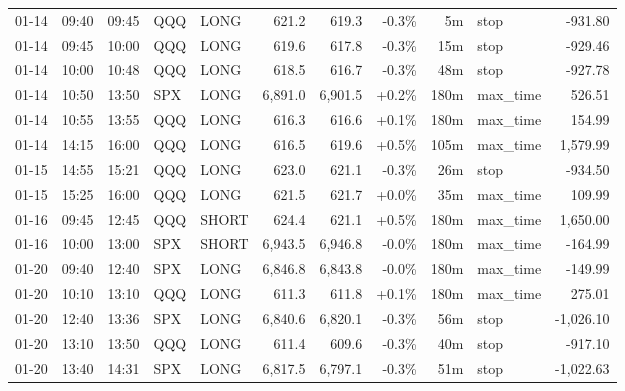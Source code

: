 \documentclass[11pt,a4paper,twoside]{article}
\begin{document}
\begin{center}
\begin{longtable}{>{\color{txtmain}}l l l l l r r r r >{\color{txtmain}}l r}
01-14 & 09:40 & 09:45 & QQQ & LONG & 621.2 & 619.3 & \textcolor{lossred}{-0.3\%} & 5m & stop & \textcolor{lossred}{-931.80} \\
01-14 & 09:45 & 10:00 & QQQ & LONG & 619.6 & 617.8 & \textcolor{lossred}{-0.3\%} & 15m & stop & \textcolor{lossred}{-929.46} \\
01-14 & 10:00 & 10:48 & QQQ & LONG & 618.5 & 616.7 & \textcolor{lossred}{-0.3\%} & 48m & stop & \textcolor{lossred}{-927.78} \\
01-14 & 10:50 & 13:50 & SPX & LONG & 6,891.0 & 6,901.5 & \textcolor{wingreen}{+0.2\%} & 180m & max\_time & \textcolor{wingreen}{526.51} \\
01-14 & 10:55 & 13:55 & QQQ & LONG & 616.3 & 616.6 & \textcolor{wingreen}{+0.1\%} & 180m & max\_time & \textcolor{wingreen}{154.99} \\
01-14 & 14:15 & 16:00 & QQQ & LONG & 616.5 & 619.6 & \textcolor{wingreen}{+0.5\%} & 105m & max\_time & \textcolor{wingreen}{1,579.99} \\
01-15 & 14:55 & 15:21 & QQQ & LONG & 623.0 & 621.1 & \textcolor{lossred}{-0.3\%} & 26m & stop & \textcolor{lossred}{-934.50} \\
01-15 & 15:25 & 16:00 & QQQ & LONG & 621.5 & 621.7 & \textcolor{wingreen}{+0.0\%} & 35m & max\_time & \textcolor{wingreen}{109.99} \\
01-16 & 09:45 & 12:45 & QQQ & SHORT & 624.4 & 621.1 & \textcolor{wingreen}{+0.5\%} & 180m & max\_time & \textcolor{wingreen}{1,650.00} \\
01-16 & 10:00 & 13:00 & SPX & SHORT & 6,943.5 & 6,946.8 & \textcolor{lossred}{-0.0\%} & 180m & max\_time & \textcolor{lossred}{-164.99} \\
01-20 & 09:40 & 12:40 & SPX & LONG & 6,846.8 & 6,843.8 & \textcolor{lossred}{-0.0\%} & 180m & max\_time & \textcolor{lossred}{-149.99} \\
01-20 & 10:10 & 13:10 & QQQ & LONG & 611.3 & 611.8 & \textcolor{wingreen}{+0.1\%} & 180m & max\_time & \textcolor{wingreen}{275.01} \\
01-20 & 12:40 & 13:36 & SPX & LONG & 6,840.6 & 6,820.1 & \textcolor{lossred}{-0.3\%} & 56m & stop & \textcolor{lossred}{-1,026.10} \\
01-20 & 13:10 & 13:50 & QQQ & LONG & 611.4 & 609.6 & \textcolor{lossred}{-0.3\%} & 40m & stop & \textcolor{lossred}{-917.10} \\
01-20 & 13:40 & 14:31 & SPX & LONG & 6,817.5 & 6,797.1 & \textcolor{lossred}{-0.3\%} & 51m & stop & \textcolor{lossred}{-1,022.63} \\

\end{longtable}
\end{center}
\end{document}
